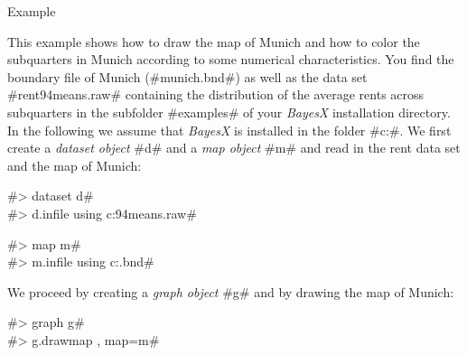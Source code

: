 \begin{stanza}{Example}

{This example shows how to draw the map of Munich and how to color
the subquarters in Munich according to some numerical
characteristics. You find the boundary file of Munich
(#munich.bnd#) as well as the data set #rent94means.raw#
containing the distribution of the average rents across
subquarters in the subfolder #examples# of your {\em BayesX}
installation directory. In the following we assume that {\em
BayesX} is installed in the folder #c:\bayesx#. We
first create a {\em dataset object} #d# and a {\em map object} #m#
and read in the rent data set and the map of Munich:

#> dataset d# \\
#> d.infile using c:\bayesx\examples\rent94means.raw#

#> map m# \\
#> m.infile using c:\bayesx\examples\munich.bnd#

We proceed by creating a {\em graph object} #g# and by drawing the map of Munich:

#> graph g# \\
#> g.drawmap , map=m#

}
\end{stanza}
